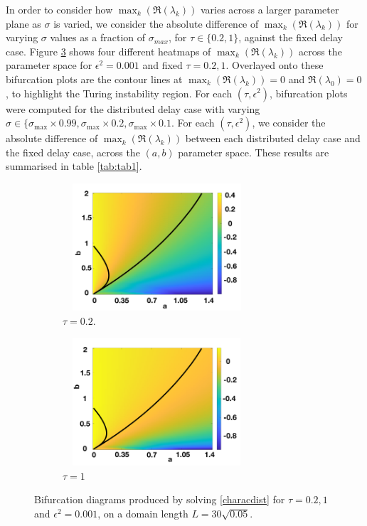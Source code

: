  In order to consider how $\max_k(\Re(\lambda_k))$ varies across a larger parameter plane as $\sigma$ is varied, we consider the absolute difference of $\max_k(\Re(\lambda_k))$ for varying $\sigma$ values as a fraction of $\sigma_{max}$, for $\tau\in\{0.2,1\}$, against the fixed delay case. Figure \ref{fig:distheat} shows four different heatmaps of $\max_k(\Re(\lambda_k))$ across the parameter space for $\epsilon^2=0.001$ and fixed $\tau=0.2,1$. Overlayed onto these bifurcation plots are the contour lines at $\max_k(\Re(\lambda_k))=0$ and $\Re(\lambda_0)=0$, to highlight the Turing instability region. For each $(\tau,\epsilon^2)$, bifurcation plots were computed for the distributed delay case with varying $\sigma\in\{\sigma_{\max}\times0.99,\sigma_{\max}\times0.2,\sigma_{\max}\times0.1$. For each $(\tau,\epsilon^2)$, we consider the absolute difference of $\max_k(\Re(\lambda_k))$ between each distributed delay case and the fixed delay case, across the $(a,b)$ parameter space. These results are summarised in table \ref{tab:tab1}.
\begin{figure}[H]
    \centering
    \begin{subfigure}[b]{0.45\textwidth}
        \centering
        \includegraphics[width=7cm,height=4.75cm]{t1f1.png}
        \caption{$\tau=0.2$.}
        \label{}
    \end{subfigure}
    \hfill
    \begin{subfigure}[b]{0.45\textwidth}
        \centering
        \includegraphics[width=7cm,height=4.75cm]{t2f1.png}
        \caption{$\tau=1$}
        \label{}
    \end{subfigure}
    \caption{Bifurcation diagrams produced by solving \eqref{characdist} for $\tau=0.2,1$ and $\epsilon^2=0.001$, on a domain length $L=30\sqrt{0.05}$.}
    \label{fig:distheat}
\end{figure}


